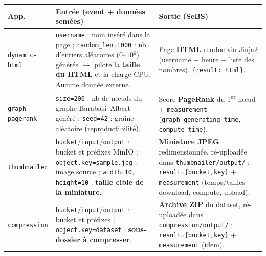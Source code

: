 \documentclass[10pt,a4paper]{article}
\newcommand{\code}[1]{\texttt{\small #1}}
\begin{document}
\begin{center}\footnotesize
\begin{tabular}{@{}l p{6.9cm} p{6.6cm}@{}}
\toprule
\textbf{App.} & \textbf{Entrée (event + données semées)} & \textbf{Sortie (SeBS)} \\
\midrule
\code{dynamic-html} &
\code{username} : nom inséré dans la page ; \code{random\_len=1000} : nb d'entiers aléatoires
(0--10$^6$) générés $\rightarrow$ pilote la \textbf{taille du HTML} et la charge CPU. Aucune donnée externe. &
Page \textbf{HTML} rendue via Jinja2 (username + heure + liste des nombres). \code{\{result: html\}}. \\
\addlinespace
\code{graph-pagerank} &
\code{size=200} : nb de n\oe{}uds du graphe Barab\'asi--Albert généré ; \code{seed=42} : graine
aléatoire (reproductibilité). &
Score \textbf{PageRank} du 1\textsuperscript{er} n\oe{}ud + \code{measurement}
(\code{graph\_generating\_time}, \code{compute\_time}). \\
\addlinespace
\code{thumbnailer} &
\code{bucket}/\code{input}/\code{output} : bucket et préfixes MinIO ; \code{object.key=sample.jpg} :
image source ; \code{width=10, height=10} : \textbf{taille cible de la miniature}. &
\textbf{Miniature JPEG} redimensionnée, ré-uploadée dans \code{thumbnailer/output/} ;
\code{result=\{bucket,key\}} + \code{measurement} (temps/tailles download, compute, upload). \\
\addlinespace
\code{compression} &
\code{bucket}/\code{input}/\code{output} : bucket et préfixes ; \code{object.key=dataset} :
\textbf{sous-dossier à compresser}. &
\textbf{Archive ZIP} du dataset, ré-uploadée dans \code{compression/output/} ;
\code{result=\{bucket,key\}} + \code{measurement} (idem). \\
\bottomrule
\end{tabular}
\end{center}
\end{document}

